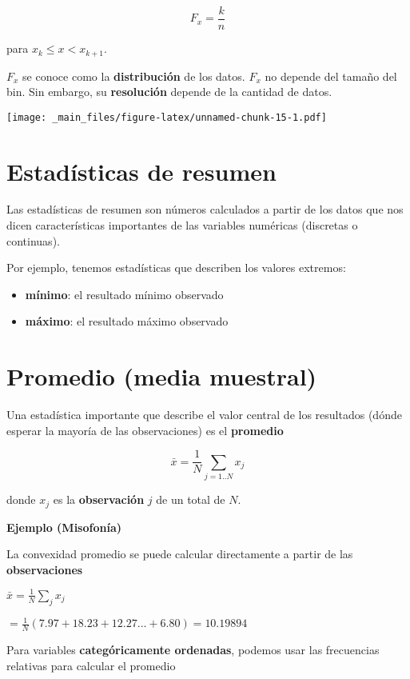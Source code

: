 \documentclass[
]{book}
\providecommand{\tightlist}{%
  \setlength{\itemsep}{0pt}\setlength{\parskip}{0pt}}
\begin{document}
\[F_x = \frac{k}{n}\]

para \(x_{k} \leq x < x_{k+1}\).

\(F_x\) se conoce como la \textbf{distribución} de los datos. \(F_x\) no depende del tamaño del bin. Sin embargo, su \textbf{resolución} depende de la cantidad de datos.

\texttt{[image: \_main\_files/figure-latex/unnamed-chunk-15-1.pdf]}

\hypertarget{estaduxedsticas-de-resumen}{%
\section{Estadísticas de resumen}\label{estaduxedsticas-de-resumen}}

Las estadísticas de resumen son números calculados a partir de los datos que nos dicen características importantes de las variables numéricas (discretas o continuas).

Por ejemplo, tenemos estadísticas que describen los valores extremos:

\begin{itemize}
\tightlist
\item
  \textbf{mínimo}: el resultado mínimo observado
\item
  \textbf{máximo}: el resultado máximo observado
\end{itemize}

\hypertarget{promedio-media-muestral}{%
\section{Promedio (media muestral)}\label{promedio-media-muestral}}

Una estadística importante que describe el valor central de los resultados (dónde esperar la mayoría de las observaciones) es el \textbf{promedio}

\[\bar{x}=\frac{1}{N} \sum_{j=1..N} x_j\]

donde \(x_j\) es la \textbf{observación} \(j\) de un total de \(N\).

\textbf{Ejemplo (Misofonía)}

La convexidad promedio se puede calcular directamente a partir de las \textbf{observaciones}

\(\bar{x}= \frac{1}{N}\sum_j x_j\)

\(= \frac{1}{N}(7.97 + 18.23 + 12.27... + 6.80) = 10.19894\)

Para variables \textbf{categóricamente ordenadas}, podemos usar las frecuencias relativas para calcular el promedio
\end{document}
